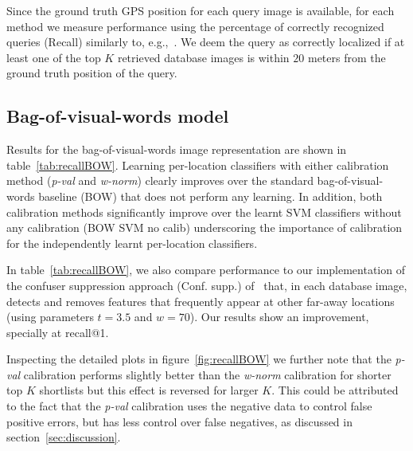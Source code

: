   Since the ground truth GPS position for each query image is available, for each method we measure performance using the percentage of correctly recognized queries (Recall) similarly to, e.g.,~\cite{Chen11,Knopp2010,Sattler-BMVC12}. We deem the query as correctly localized if at least one of the top $K$ retrieved database images is within $20$ meters from the ground truth position of the query. 


  \subsection{Bag-of-visual-words model}
  \label{sec:bow_results}
%
    Results for the bag-of-visual-words image representation are shown in table~\ref{tab:recallBOW}.  
    Learning per-location classifiers with either calibration method (\emph{p-val} and \emph{w-norm}) clearly improves over the standard bag-of-visual-words baseline (BOW) that does not perform any learning. In addition, both calibration methods significantly improve over the learnt SVM classifiers without any calibration (BOW SVM no calib) underscoring the importance of calibration for the independently learnt per-location classifiers.  

    In table~\ref{tab:recallBOW}, we also compare performance to our implementation of the confuser suppression approach (Conf. supp.) of~\cite{Knopp2010} that, in each database image, detects and removes features that frequently appear at other far-away locations (using parameters $t=3.5$ and $w=70$).  
    \textcolor{petr} {Our results show an improvement, specially at recall@1.}


    Inspecting the detailed plots in figure~\ref{fig:recallBOW} we further note that the  \emph{p-val} calibration performs slightly better than the \emph{w-norm} calibration for shorter top $K$ shortlists but this effect is reversed for larger $K$. This could be attributed to the fact that the \emph{p-val} calibration uses the negative data to control false positive errors, but has less control over false negatives, as discussed in section~\ref{sec:discussion}. 

